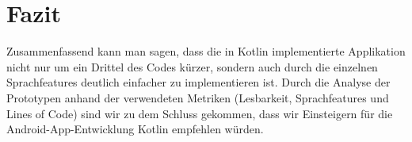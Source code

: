 \documentclass{sigchi-ext}
\begin{document}
\section{Fazit}
Zusammenfassend kann man sagen, dass die in Kotlin implementierte Applikation nicht nur um ein Drittel des Codes kürzer, sondern auch durch die einzelnen Sprachfeatures deutlich einfacher zu implementieren ist.
Durch die Analyse der Prototypen anhand der verwendeten Metriken (Lesbarkeit, Sprachfeatures und Lines of Code) sind wir zu dem Schluss gekommen, dass wir Einsteigern für die Android-App-Entwicklung Kotlin empfehlen würden.





\end{document}

